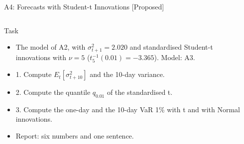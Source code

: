 \begin{frame}{A4: Forecasts with Student-t Innovations [Proposed]}
\propsub
\itemsize{\scriptsize}
\begin{columns}[T]
\begin{column}{\taskw}
\begin{block}{Task}
\begin{itemize}
    \item The model of A2, with $\sigma_{t+1}^2 = 2.020$ and standardised Student-t innovations with $\nu = 5$ ($t_5^{-1}(0.01) = -3.365$). Model: A3.
    \item 1. Compute $E_t[\sigma_{t+10}^2]$ and the 10-day variance.
    \item 2. Compute the quantile $q_{0.01}$ of the standardised t.
    \item 3. Compute the one-day and the 10-day VaR 1\% with t and with Normal innovations.
    \item Report: six numbers and one sentence.
\end{itemize}
\end{block}
\end{column}
\begin{column}{\solw}
\end{column}
\end{columns}
\end{frame}

